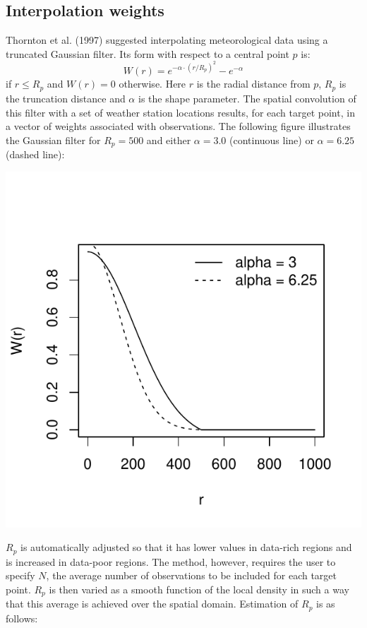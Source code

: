 \documentclass[11pt,a4paper]{article}
\begin{document}
\subsection{Interpolation weights}
Thornton et al. (1997) suggested interpolating meteorological data using a truncated Gaussian filter. Its form with respect to a central point $p$ is:
\begin{equation}
W(r) = e^{-\alpha \cdot (r/R_p)^2} - e^{-\alpha}
\end{equation}
if $r \leq R_p$ and $W(r) = 0$ otherwise. Here $r$ is the radial distance from $p$, $R_p$ is the truncation distance and $\alpha$ is the shape parameter. The spatial convolution of this filter with a set of weather station locations results, for each target point, in a vector of weights associated with observations. The following figure illustrates the Gaussian filter for $R_p = 500$ and either $\alpha = 3.0$ (continuous line) or $\alpha = 6.25$ (dashed line):
\begin{center}
\includegraphics{Meteorology-008}
\end{center}
$R_p$ is automatically adjusted so that it has lower values in data-rich regions and is increased in data-poor regions. The method, however, requires the user to specify $N$, the average number of observations to be included for each target point. $R_p$ is then varied as a smooth function of the local density in such a way that this average is achieved over the spatial domain. Estimation of $R_p$ is as follows:
\end{document}
